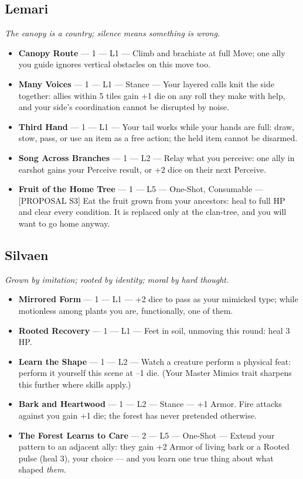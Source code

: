 \subsection{Lemari}
\textit{The canopy is a country; silence means something is wrong.}
\begin{itemize}
    \item \textbf{Canopy Route} --- 1 --- L1 --- Climb and brachiate at full Move; one ally you guide ignores vertical obstacles on this move too.
    \item \textbf{Many Voices} --- 1 --- L1 --- Stance --- Your layered calls knit the side together: allies within 5 tiles gain +1 die on any roll they make with help, and your side's coordination cannot be disrupted by noise.
    \item \textbf{Third Hand} --- 1 --- L1 --- Your tail works while your hands are full: draw, stow, pass, or use an item as a free action; the held item cannot be disarmed.
    \item \textbf{Song Across Branches} --- 1 --- L2 --- Relay what you perceive: one ally in earshot gains your Perceive result, or +2 dice on their next Perceive.
    \item \textbf{Fruit of the Home Tree} --- 1 --- L5 --- One-Shot, Consumable --- [PROPOSAL S3] Eat the fruit grown from your ancestors: heal to full HP and clear every condition. It is replaced only at the clan-tree, and you will want to go home anyway.
\end{itemize}

\subsection{Silvaen}
\textit{Grown by imitation; rooted by identity; moral by hard thought.}
\begin{itemize}
    \item \textbf{Mirrored Form} --- 1 --- L1 --- +2 dice to pass as your mimicked type; while motionless among plants you are, functionally, one of them.
    \item \textbf{Rooted Recovery} --- 1 --- L1 --- Feet in soil, unmoving this round: heal 3 HP.
    \item \textbf{Learn the Shape} --- 1 --- L2 --- Watch a creature perform a physical feat: perform it yourself this scene at --1 die. (Your Master Mimics trait sharpens this further where skills apply.)
    \item \textbf{Bark and Heartwood} --- 1 --- L2 --- Stance --- +1 Armor. Fire attacks against you gain +1 die; the forest has never pretended otherwise.
    \item \textbf{The Forest Learns to Care} --- 2 --- L5 --- One-Shot --- Extend your pattern to an adjacent ally: they gain +2 Armor of living bark or a Rooted pulse (heal 3), your choice --- and you learn one true thing about what shaped \textit{them}.
\end{itemize}

